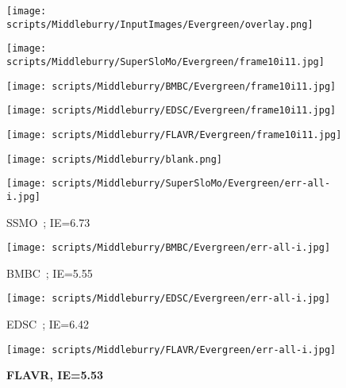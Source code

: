\documentclass[10pt,twocolumn,letterpaper]{article}
\begin{document}
\begin{figure*}[t]
\begin{center}
\vspace{1em}
    \begin{subfigure}[b]{0.18\textwidth}
        \centering
        \texttt{[image: scripts/Middleburry/InputImages/Evergreen/overlay.png]}
    \end{subfigure}
    \hfill
    \begin{subfigure}[b]{0.18\textwidth}
        \centering
        \texttt{[image: scripts/Middleburry/SuperSloMo/Evergreen/frame10i11.jpg]}
    \end{subfigure}
    \hfill
    \begin{subfigure}[b]{0.18\textwidth}
        \centering
        \texttt{[image: scripts/Middleburry/BMBC/Evergreen/frame10i11.jpg]}
    \end{subfigure}
    \hfill
    \begin{subfigure}[b]{0.18\textwidth}
        \centering
        \texttt{[image: scripts/Middleburry/EDSC/Evergreen/frame10i11.jpg]}
    \end{subfigure}
    \hfill
    \begin{subfigure}[b]{0.18\textwidth}
        \centering
        \texttt{[image: scripts/Middleburry/FLAVR/Evergreen/frame10i11.jpg]}
    \end{subfigure}


     \begin{subfigure}[b]{0.18\textwidth}
        \centering
        \texttt{[image: scripts/Middleburry/blank.png]}
    \end{subfigure}
    \hfill
    \begin{subfigure}[b]{0.18\textwidth}
        \centering
        \texttt{[image: scripts/Middleburry/SuperSloMo/Evergreen/err-all-i.jpg]}
        \caption*{SSMO~\cite{jiang2018super}; IE=6.73}
    \end{subfigure}
    \hfill
    \begin{subfigure}[b]{0.18\textwidth}
        \centering
        \texttt{[image: scripts/Middleburry/BMBC/Evergreen/err-all-i.jpg]}
        \caption*{BMBC~\cite{park2020bmbc}; IE=5.55}
    \end{subfigure}
    \hfill
    \begin{subfigure}[b]{0.18\textwidth}
        \centering
        \texttt{[image: scripts/Middleburry/EDSC/Evergreen/err-all-i.jpg]}
        \caption*{EDSC~\cite{cheng2020multiple}; IE=6.42}
    \end{subfigure}
    \hfill
    \begin{subfigure}[b]{0.18\textwidth}
        \centering
        \texttt{[image: scripts/Middleburry/FLAVR/Evergreen/err-all-i.jpg]}
        \caption*{\textbf{FLAVR, IE=5.53}}
    \end{subfigure}
    



\end{center}
\end{figure*}
\end{document}
